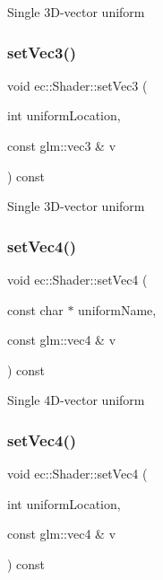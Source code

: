 Single 3\+D-\/vector uniform \mbox{\label{classec_1_1_shader_ad56db104412fd877ffabcb04601a8e5b}} 
\subsubsection{\texorpdfstring{set\+Vec3()}{setVec3()}\hspace{0.1cm}{\footnotesize\ttfamily [2/2]}}
{\footnotesize\ttfamily void ec\+::\+Shader\+::set\+Vec3 (\begin{DoxyParamCaption}\item[{int}]{uniform\+Location,  }\item[{const glm\+::vec3 \&}]{v }\end{DoxyParamCaption}) const}

Single 3\+D-\/vector uniform \mbox{\label{classec_1_1_shader_aa311a1a3aba3a637886b8f019717adc9}} 
\subsubsection{\texorpdfstring{set\+Vec4()}{setVec4()}\hspace{0.1cm}{\footnotesize\ttfamily [1/2]}}
{\footnotesize\ttfamily void ec\+::\+Shader\+::set\+Vec4 (\begin{DoxyParamCaption}\item[{const char $\ast$}]{uniform\+Name,  }\item[{const glm\+::vec4 \&}]{v }\end{DoxyParamCaption}) const}

Single 4\+D-\/vector uniform \mbox{\label{classec_1_1_shader_a2876cd885c089ff9f8e3dbb9639931f0}} 
\subsubsection{\texorpdfstring{set\+Vec4()}{setVec4()}\hspace{0.1cm}{\footnotesize\ttfamily [2/2]}}
{\footnotesize\ttfamily void ec\+::\+Shader\+::set\+Vec4 (\begin{DoxyParamCaption}\item[{int}]{uniform\+Location,  }\item[{const glm\+::vec4 \&}]{v }\end{DoxyParamCaption}) const}

